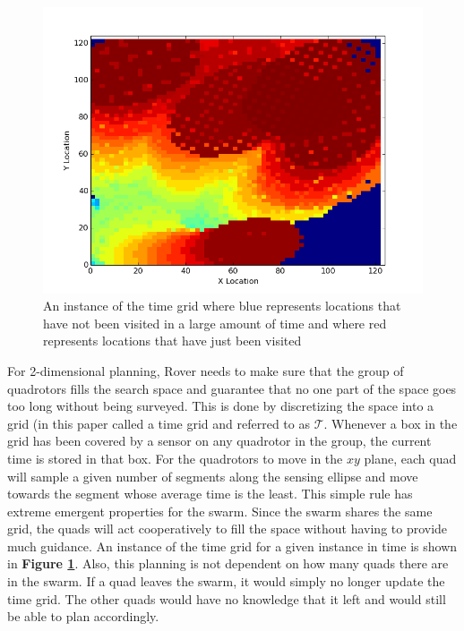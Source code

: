 \documentclass[12pt]{article}
\newcommand{\fig}[1]{\textbf{Figure \ref{fig:#1}}}
\begin{document}
\begin{figure}[ht]

    \begin{center}

        \includegraphics[width=\linewidth]{figs/timegrid_map.png}

    \end{center}

    \caption{An instance of the time grid where blue represents locations that
        have not been visited in a large amount of time and where red
    represents locations that have just been visited}
    
    \label{fig:timegrid}

\end{figure} 

For 2-dimensional planning, Rover needs to make sure that the group of
quadrotors fills the search space and guarantee that no one part of the space
goes too long without being surveyed. This is done by discretizing the space
into a grid (in this paper called a time grid and referred to as $\mathcal{T}$.
Whenever a box in the grid has been covered by a sensor on any quadrotor in the
group, the current time is stored in that box.  For the quadrotors to move in
the $xy$ plane, each quad will sample a given number of segments along the
sensing ellipse and move towards the segment whose average time is the least.
This simple rule has extreme emergent properties for the swarm.  Since the
swarm shares the same grid, the quads will act cooperatively to fill the space
without having to provide much guidance.  An instance of the time grid for a
given instance in time is shown in \fig{timegrid}.  Also, this planning is not
dependent on how many quads there are in the swarm.  If a quad leaves the
swarm, it would simply no longer update the time grid. The other quads would
have no knowledge that it left and would still be able to plan accordingly. 
\end{document}
